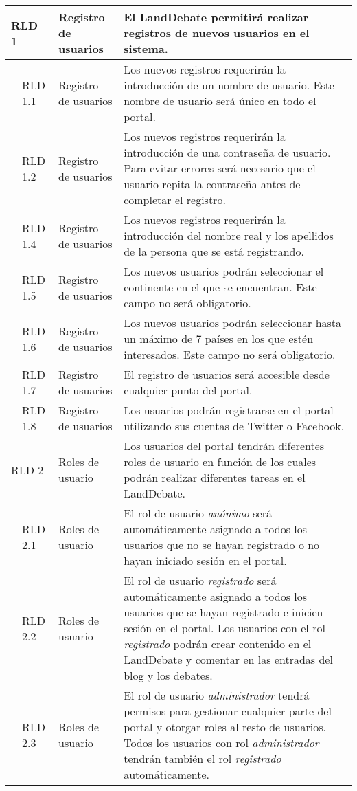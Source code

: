 \begin{longtable}[c]{|p{1mm}|p{14mm}|p{30mm}|p{90mm}|}
\multicolumn{2}{|l|}{RLD 1} & Registro de usuarios & El LandDebate permitirá realizar registros de nuevos usuarios en el sistema. \\
\hline
& RLD 1.1 & Registro de usuarios & Los nuevos registros requerirán la introducción de un nombre de usuario.  Este nombre de usuario será único en todo el portal. \\
\hline
& RLD 1.2 & Registro de usuarios & Los nuevos registros requerirán la introducción de una contraseña de usuario.  Para evitar errores será necesario que el usuario repita la contraseña antes de completar el registro. \\
\hline
& RLD 1.4 & Registro de usuarios & Los nuevos registros requerirán la introducción del nombre real y los apellidos de la persona que se está registrando. \\
\hline
& RLD 1.5 & Registro de usuarios & Los nuevos usuarios podrán seleccionar el continente en el que se encuentran.  Este campo no será obligatorio. \\
\hline
& RLD 1.6 & Registro de usuarios & Los nuevos usuarios podrán seleccionar hasta un máximo de 7 países en los que estén interesados.  Este campo no será obligatorio. \\
\hline
& RLD 1.7 & Registro de usuarios & El registro de usuarios será accesible desde cualquier punto del portal. \\
\hline
& RLD 1.8 & Registro de usuarios & Los usuarios podrán registrarse en el portal utilizando sus cuentas de Twitter o Facebook. \\
\hline
\multicolumn{2}{|l|}{RLD 2} & Roles de usuario & Los usuarios del portal tendrán diferentes roles de usuario en función de los cuales podrán realizar diferentes tareas en el LandDebate. \\
\hline
& RLD 2.1 & Roles de usuario & El rol de usuario \textit{anónimo} será automáticamente asignado a todos los usuarios que no se hayan registrado o no hayan iniciado sesión en el portal. \\
\hline
& RLD 2.2 & Roles de usuario & El rol de usuario \textit{registrado} será automáticamente asignado a todos los usuarios que se hayan registrado e inicien sesión en el portal. Los usuarios con el rol \textit{registrado} podrán crear contenido en el LandDebate y comentar en las entradas del blog y los debates.\\
\hline
& RLD 2.3 & Roles de usuario & El rol de usuario \textit{administrador} tendrá permisos para gestionar cualquier parte del portal y otorgar roles al resto de usuarios. Todos los usuarios con rol \textit{administrador} tendrán también el rol \textit{registrado} automáticamente. \\

\end{longtable}
